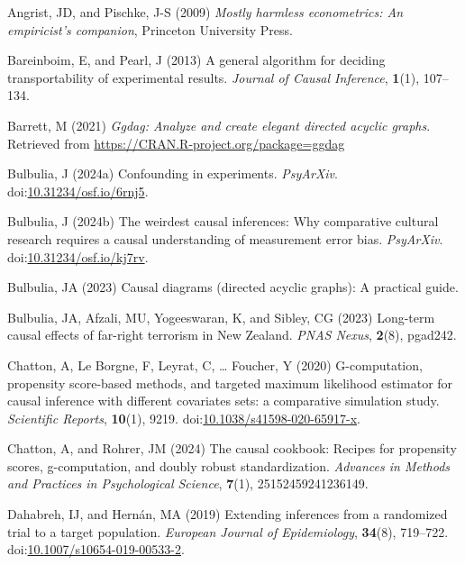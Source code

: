\documentclass[
  single column]{article}
\newlength{\cslhangindent}
\newenvironment{CSLReferences}[2] %
 {\begin{list}{}{%
  \setlength{\itemindent}{0pt}
  \setlength{\leftmargin}{0pt}
  \setlength{\parsep}{0pt}
  \ifodd #1
   \setlength{\leftmargin}{\cslhangindent}
   \setlength{\itemindent}{-1\cslhangindent}
  \fi
  \setlength{\itemsep}{#2\baselineskip}}}
 {\end{list}}
\begin{document}
\label{refs}
\begin{CSLReferences}{1}{0}
Angrist, JD, and Pischke, J-S (2009) \emph{Mostly harmless econometrics:
An empiricist's companion}, Princeton University Press.

Bareinboim, E, and Pearl, J (2013) A general algorithm for deciding
transportability of experimental results. \emph{Journal of Causal
Inference}, \textbf{1}(1), 107--134.

Barrett, M (2021) \emph{Ggdag: Analyze and create elegant directed
acyclic graphs}. Retrieved from
\url{https://CRAN.R-project.org/package=ggdag}

Bulbulia, J (2024a) Confounding in experiments. \emph{PsyArXiv}.
doi:\href{https://doi.org/10.31234/osf.io/6rnj5}{10.31234/osf.io/6rnj5}.

Bulbulia, J (2024b) The weirdest causal inferences: Why comparative
cultural research requires a causal understanding of measurement error
bias. \emph{PsyArXiv}.
doi:\href{https://doi.org/10.31234/osf.io/kj7rv}{10.31234/osf.io/kj7rv}.

Bulbulia, JA (2023) Causal diagrams (directed acyclic graphs): A
practical guide.

Bulbulia, JA, Afzali, MU, Yogeeswaran, K, and Sibley, CG (2023)
Long-term causal effects of far-right terrorism in {N}ew {Z}ealand.
\emph{PNAS Nexus}, \textbf{2}(8), pgad242.

Chatton, A, Le Borgne, F, Leyrat, C, \ldots{} Foucher, Y (2020)
G-computation, propensity score-based methods, and targeted maximum
likelihood estimator for causal inference with different covariates
sets: a comparative simulation study. \emph{Scientific Reports},
\textbf{10}(1), 9219.
doi:\href{https://doi.org/10.1038/s41598-020-65917-x}{10.1038/s41598-020-65917-x}.

Chatton, A, and Rohrer, JM (2024) The causal cookbook: Recipes for
propensity scores, g-computation, and doubly robust standardization.
\emph{Advances in Methods and Practices in Psychological Science},
\textbf{7}(1), 25152459241236149.

Dahabreh, IJ, and Hernán, MA (2019) Extending inferences from a
randomized trial to a target population. \emph{European Journal of
Epidemiology}, \textbf{34}(8), 719--722.
doi:\href{https://doi.org/10.1007/s10654-019-00533-2}{10.1007/s10654-019-00533-2}.


\end{CSLReferences}
\end{document}
